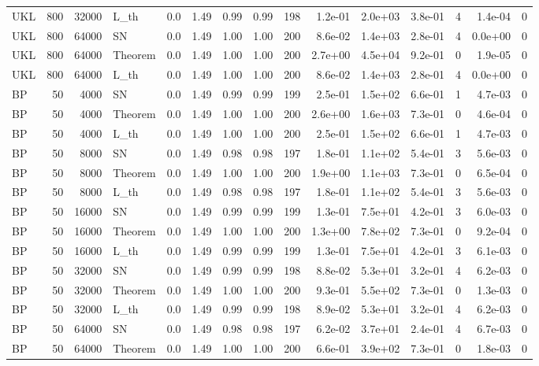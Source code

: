 \begin{tabular}{lrrlrrrrrrrrrrr}
UKL & 800 & 32000 & L\_th & 0.0 & 1.49 & 0.99 & 0.99 & 198 & 1.2e-01 & 2.0e+03 & 3.8e-01 & 4 & 1.4e-04 & 0 \\
UKL & 800 & 64000 & SN & 0.0 & 1.49 & 1.00 & 1.00 & 200 & 8.6e-02 & 1.4e+03 & 2.8e-01 & 4 & 0.0e+00 & 0 \\
UKL & 800 & 64000 & Theorem & 0.0 & 1.49 & 1.00 & 1.00 & 200 & 2.7e+00 & 4.5e+04 & 9.2e-01 & 0 & 1.9e-05 & 0 \\
UKL & 800 & 64000 & L\_th & 0.0 & 1.49 & 1.00 & 1.00 & 200 & 8.6e-02 & 1.4e+03 & 2.8e-01 & 4 & 0.0e+00 & 0 \\
BP & 50 & 4000 & SN & 0.0 & 1.49 & 0.99 & 0.99 & 199 & 2.5e-01 & 1.5e+02 & 6.6e-01 & 1 & 4.7e-03 & 0 \\
BP & 50 & 4000 & Theorem & 0.0 & 1.49 & 1.00 & 1.00 & 200 & 2.6e+00 & 1.6e+03 & 7.3e-01 & 0 & 4.6e-04 & 0 \\
BP & 50 & 4000 & L\_th & 0.0 & 1.49 & 1.00 & 1.00 & 200 & 2.5e-01 & 1.5e+02 & 6.6e-01 & 1 & 4.7e-03 & 0 \\
BP & 50 & 8000 & SN & 0.0 & 1.49 & 0.98 & 0.98 & 197 & 1.8e-01 & 1.1e+02 & 5.4e-01 & 3 & 5.6e-03 & 0 \\
BP & 50 & 8000 & Theorem & 0.0 & 1.49 & 1.00 & 1.00 & 200 & 1.9e+00 & 1.1e+03 & 7.3e-01 & 0 & 6.5e-04 & 0 \\
BP & 50 & 8000 & L\_th & 0.0 & 1.49 & 0.98 & 0.98 & 197 & 1.8e-01 & 1.1e+02 & 5.4e-01 & 3 & 5.6e-03 & 0 \\
BP & 50 & 16000 & SN & 0.0 & 1.49 & 0.99 & 0.99 & 199 & 1.3e-01 & 7.5e+01 & 4.2e-01 & 3 & 6.0e-03 & 0 \\
BP & 50 & 16000 & Theorem & 0.0 & 1.49 & 1.00 & 1.00 & 200 & 1.3e+00 & 7.8e+02 & 7.3e-01 & 0 & 9.2e-04 & 0 \\
BP & 50 & 16000 & L\_th & 0.0 & 1.49 & 0.99 & 0.99 & 199 & 1.3e-01 & 7.5e+01 & 4.2e-01 & 3 & 6.1e-03 & 0 \\
BP & 50 & 32000 & SN & 0.0 & 1.49 & 0.99 & 0.99 & 198 & 8.8e-02 & 5.3e+01 & 3.2e-01 & 4 & 6.2e-03 & 0 \\
BP & 50 & 32000 & Theorem & 0.0 & 1.49 & 1.00 & 1.00 & 200 & 9.3e-01 & 5.5e+02 & 7.3e-01 & 0 & 1.3e-03 & 0 \\
BP & 50 & 32000 & L\_th & 0.0 & 1.49 & 0.99 & 0.99 & 198 & 8.9e-02 & 5.3e+01 & 3.2e-01 & 4 & 6.2e-03 & 0 \\
BP & 50 & 64000 & SN & 0.0 & 1.49 & 0.98 & 0.98 & 197 & 6.2e-02 & 3.7e+01 & 2.4e-01 & 4 & 6.7e-03 & 0 \\
BP & 50 & 64000 & Theorem & 0.0 & 1.49 & 1.00 & 1.00 & 200 & 6.6e-01 & 3.9e+02 & 7.3e-01 & 0 & 1.8e-03 & 0 \\

\end{tabular}
